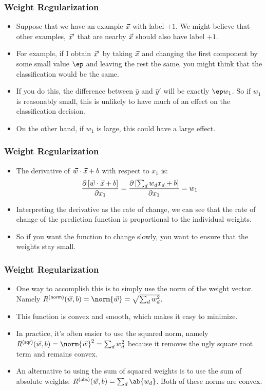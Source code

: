 \documentclass[trans,aspectratio=169]{beamer}
\begin{document}
\begin{frame}
  \frametitle{Weight Regularization}
\begin{itemize}
\item  Suppose that
we have an example ${\vec x}$ with label $+1$.  We might believe that other
examples, ${\vec x}'$ that are nearby ${\vec x}$ should also have label $+1$.
\item For example, if I obtain ${\vec x}'$ by taking ${\vec x}$ and changing the first
component by some small value $\ep$ and leaving the rest the same, you
might think that the classification would be the same.  
\item If you do
this, the difference between $\hat y$ and $\hat y'$ will be exactly
$\ep w_1$.  So if $w_1$ is reasonably small, this is unlikely to have
much of an effect on the classification decision. 
\item On the other hand,
if $w_1$ is large, this could have a large effect.
\end{itemize}
\end{frame}

\begin{frame}
  \frametitle{Weight Regularization}
\begin{itemize}
\item
 The derivative of
${\vec w} \cdot {\vec x}+b$ with respect to $x_1$ is:
\begin{equation}
\frac {\partial \left[{\vec w} \cdot {\vec x}+b\right]} {\partial x_1}
= \frac {\partial \left[\sum_d w_d x_d+b\right]} {\partial x_1}
= w_1
\end{equation}
\item Interpreting the derivative as the rate of change, we can see that the
rate of change of the prediction function is proportional to the
individual weights. 
\item So if you want the function to change slowly, you
want to ensure that the weights stay small.
\end{itemize}
\end{frame}

\begin{frame}
  \frametitle{Weight Regularization}
\begin{itemize}
\item
One way to accomplish this is to simply use the norm of the weight
vector.  Namely $R\xth{norm}(\vw,b) = \norm{\vw} = \sqrt{\sum_d
  w_d^2}$.  
  \item This function is convex and smooth, which makes it easy to
minimize. 
\item  In practice, it's often easier to use the squared norm,
namely $R\xth{sqr}(\vw,b) = \norm{\vw}^2 = \sum_d w_d^2$ because it
removes the ugly square root term and remains convex. 
\item  An alternative
to using the sum of squared weights is to use the sum of absolute
weights: $R\xth{abs}(\vw,b) = \sum_d \ab{w_d}$.  Both of these norms
are convex.
\end{itemize}
\end{frame}
\end{document}
